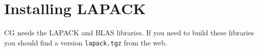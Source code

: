 \documentclass{article}
\begin{document}
% 


\clearpage






\clearpage
\section{Installing LAPACK}

CG needs the LAPACK and BLAS libraries. If you need to build these libraries you
should find a version {\tt lapack.tgz} from the web. 
\end{document}

